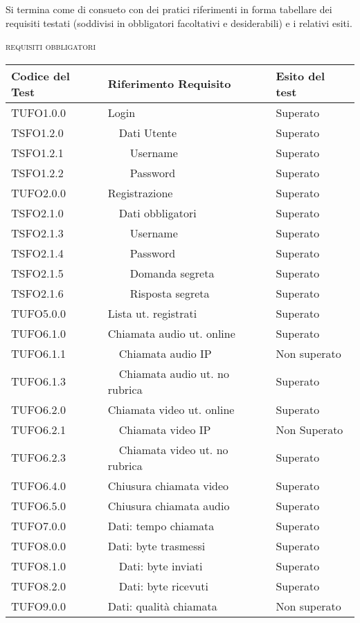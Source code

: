 Si termina come di consueto con dei pratici riferimenti in forma tabellare dei requisiti testati (soddivisi in obbligatori facoltativi e desiderabili) e i relativi esiti.

\begin{center}
\textsc{requisiti obbligatori}
\end{center}
\begin{longtable}{lp{}l}
\toprule Codice del Test & Riferimento Requisito& Esito del test\\
\midrule

TUFO1.0.0	&Login		&Superato\\
TSFO1.2.0	&\ \ Dati Utente  &Superato\\
TSFO1.2.1	&\ \ \ \ Username		&Superato\\
TSFO1.2.2	&\ \ \ \ Password		&Superato\\
TUFO2.0.0&	Registrazione		&Superato\\
TSFO2.1.0&	\ \ Dati obbligatori	&Superato\\
TSFO2.1.3&	\ \ \ \ Username		&Superato\\
TSFO2.1.4&	\ \ \ \ Password		&Superato\\
TSFO2.1.5&	\ \ \ \ Domanda segreta	&Superato\\
TSFO2.1.6&	\ \ \ \ Risposta segreta	&Superato\\
TUFO5.0.0&	Lista ut. registrati	&Superato\\
TUFO6.1.0&	Chiamata audio ut. online	&Superato\\
TUFO6.1.1&	\ \ Chiamata audio IP		&Non superato\\
TUFO6.1.3&	\ \ Chiamata audio ut. no rubrica	&Superato\\	
TUFO6.2.0&	Chiamata video ut. online	&Superato\\
TUFO6.2.1&	\ \ Chiamata video IP		&Non Superato\\
TUFO6.2.3&	\ \ Chiamata video ut. no rubrica	&Superato\\	
TUFO6.4.0&	Chiusura chiamata video	 &Superato\\
TUFO6.5.0&	Chiusura chiamata audio	&Superato\\
TUFO7.0.0&	Dati: tempo chiamata	&Superato\\
TUFO8.0.0&	Dati: byte trasmessi	&Superato\\	
TUFO8.1.0&	\ \ Dati: byte inviati	&Superato\\	
TUFO8.2.0&	\ \ Dati: byte ricevuti	 &Superato\\	
TUFO9.0.0&	Dati: qualità chiamata	&Non superato\\

\end{longtable}
